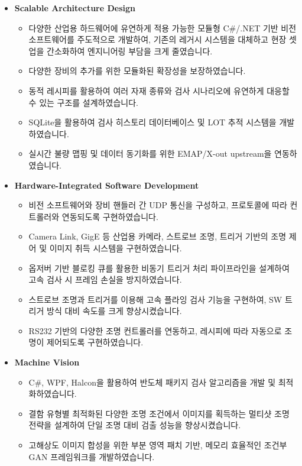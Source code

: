 \documentclass[10pt, a4paper]{cvhari}
\begin{document}
\begin{itemize}
  \item \textbf{Scalable Architecture Design}
    \begin{itemize}
      \item 다양한 산업용 하드웨어에 유연하게 적용 가능한 모듈형 C\#/.NET 기반 비전 소프트웨어를 주도적으로 개발하여, 기존의 레거시 시스템을 대체하고 현장 셋업을 간소화하여 엔지니어링 부담을 크게 줄였습니다.
      \item 다양한 장비의 추가를 위한 모듈화된 확장성을 보장하였습니다.
      \item 동적 레시피를 활용하여 여러 자재 종류와 검사 시나리오에 유연하게 대응할 수 있는 구조를 설계하였습니다.
      \item SQLite을 활용하여 검사 히스토리 데이터베이스 및 LOT 추적 시스템을 개발하였습니다.
      \item 실시간 불량 맵핑 및 데이터 동기화를 위한 EMAP/X-out upstream을 연동하였습니다.
    \end{itemize}
  \item \textbf{Hardware-Integrated Software Development}
    \begin{itemize}
      \item 비전 소프트웨어와 장비 핸들러 간 UDP 통신을 구성하고, 프로토콜에 따라 컨트롤러와 연동되도록 구현하였습니다.
      \item Camera Link, GigE 등 산업용 카메라, 스트로브 조명, 트리거 기반의 조명 제어 및 이미지 취득 시스템을 구현하였습니다.
      \item 옵저버 기반 블로킹 큐를 활용한 비동기 트리거 처리 파이프라인을 설계하여 고속 검사 시 프레임 손실을 방지하였습니다.
      \item 스트로브 조명과 트리거를 이용해 고속 플라잉 검사 기능을 구현하여, SW 트리거 방식 대비 속도를 크게 향상시켰습니다.
      \item RS232 기반의 다양한 조명 컨트롤러를 연동하고, 레시피에 따라 자동으로 조명이 제어되도록 구현하였습니다.
    \end{itemize}
  \item \textbf{Machine Vision}
    \begin{itemize}
      \item C\#, WPF, Halcon을 활용하여 반도체 패키지 검사 알고리즘을 개발 및 최적화하였습니다.
      \item 결함 유형별 최적화된 다양한 조명 조건에서 이미지를 획득하는 멀티샷 조명 전략을 설계하여 단일 조명 대비 검출 성능을 향상시켰습니다.
      \item 고해상도 이미지 합성을 위한 부분 영역 패치 기반, 메모리 효율적인 조건부 GAN 프레임워크를 개발하였습니다.

\end{itemize}
\end{itemize}
\end{document}
